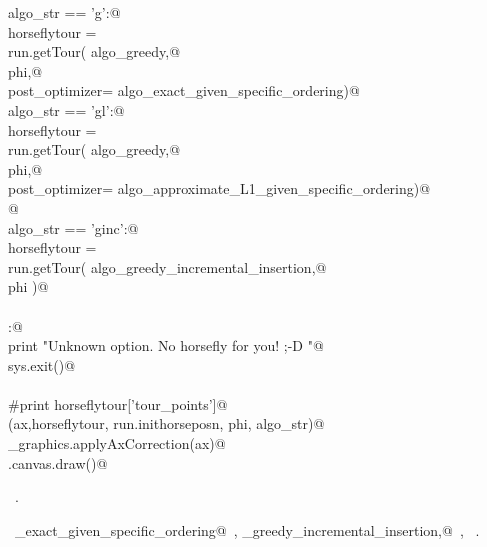 \documentclass[11.5pt]{report}
\begin{document}
\begin{flushleft}
\begin{list}{}{}
\mbox{}\verb@elif algo_str == 'g':@\\
\mbox{}\verb@      horseflytour = \@\\
\mbox{}\verb@             run.getTour( algo_greedy,@\\
\mbox{}\verb@                          phi,@\\
\mbox{}\verb@                          post_optimizer= algo_exact_given_specific_ordering)@\\
\mbox{}\verb@elif algo_str == 'gl':@\\
\mbox{}\verb@      horseflytour = \@\\
\mbox{}\verb@             run.getTour( algo_greedy,@\\
\mbox{}\verb@                          phi,@\\
\mbox{}\verb@                          post_optimizer= algo_approximate_L1_given_specific_ordering)@\\
\mbox{}\verb@                          @\\
\mbox{}\verb@elif algo_str == 'ginc':@\\
\mbox{}\verb@      horseflytour = \@\\
\mbox{}\verb@             run.getTour( algo_greedy_incremental_insertion,@\\
\mbox{}\verb@                          phi )@\\
\mbox{}\verb@@\\
\mbox{}\verb@else:@\\
\mbox{}\verb@      print "Unknown option. No horsefly for you! ;-D "@\\
\mbox{}\verb@      sys.exit()@\\
\mbox{}\verb@@\\
\mbox{}\verb@#print horseflytour['tour_points']@\\
\mbox{}\verb@plotTour(ax,horseflytour, run.inithorseposn, phi, algo_str)@\\
\mbox{}\verb@utils_graphics.applyAxCorrection(ax)@\\
\mbox{}\verb@fig.canvas.draw()@\\
\mbox{}\verb@@{\NWsep}
\end{list}
\vspace{-1.5ex}
\footnotesize
\begin{list}{}{\setlength{\itemsep}{-\parsep}\setlength{\itemindent}{-\leftmargin}}
\item \NWtxtMacroRefIn\ .
\item \NWtxtIdentsUsed\nobreak\  \verb@algo_exact_given_specific_ordering@\nobreak\ , \verb@algo_greedy_incremental_insertion,@\nobreak\ , \verb@plotTour@\nobreak\ .
\item{}
\end{list}
\vspace{4ex}
\end{flushleft}
\end{document}
